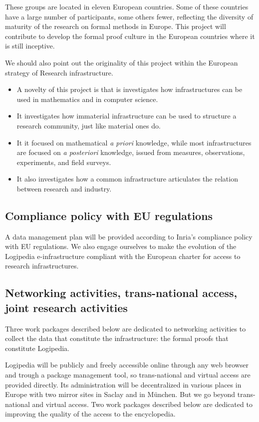These groups are located in eleven European countries.  Some of these
countries have a large number of participants, some others fewer,
reflecting the diversity of maturity of the research on formal methods
in Europe. This project will contribute to develop the formal proof
culture in the European countries where it is still inceptive.

We should also point out the originality of this project within the
European strategy of Research infrastructure.
\begin{itemize}
\item A novelty of this
project is that is investigates how infrastructures can be used in
mathematics and in computer science.
\item It investigates how immaterial
infrastructure can be used to structure a research community, just
like material ones do.
\item It it focused on mathematical {\em a priori} knowledge, while
  most infrastructures are focused on {\em a posteriori} knowledge,
  issued from measures, observations, experiments, and field surveys.
\item It also investigates how a common infrastructure articulates the
  relation between research and industry.
\end{itemize}


\subsection{Compliance policy with EU regulations}

A data management plan will be provided according to Inria’s
compliance policy with EU regulations. We also engage ourselves to
make the evolution of the Logipedia e-infrastructure compliant
with the European charter for access to research infrastructures.

\subsection{Networking activities, trans-national access, joint
  research activities}

Three work packages described below are dedicated to networking activities
to collect the data that constitute the infrastructure: the formal proofs
that constitute Logipedia.

Logipedia will be publicly and freely accessible online through any
web browser and trough a package management tool, so trans-national
and virtual access are provided directly. Its administration will be
decentralized in various places in Europe with two mirror sites in
Saclay and in München. But we go beyond trans-national and virtual
access.  Two work packages described below are dedicated to improving
the quality of the access to the encyclopedia.

